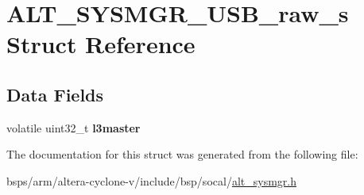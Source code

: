 \hypertarget{structALT__SYSMGR__USB__raw__s}{}\section{A\+L\+T\+\_\+\+S\+Y\+S\+M\+G\+R\+\_\+\+U\+S\+B\+\_\+raw\+\_\+s Struct Reference}
\label{structALT__SYSMGR__USB__raw__s}
\subsection*{Data Fields}
\begin{DoxyCompactItemize}
\item 
\mbox{\label{structALT__SYSMGR__USB__raw__s_a8807d34e2dd4064a760b2f67656fbb22}} 
volatile uint32\+\_\+t {\bfseries l3master}
\end{DoxyCompactItemize}


The documentation for this struct was generated from the following file\+:\begin{DoxyCompactItemize}
\item 
bsps/arm/altera-\/cyclone-\/v/include/bsp/socal/\mbox{\hyperlink{alt__sysmgr_8h}{alt\+\_\+sysmgr.\+h}}\end{DoxyCompactItemize}
